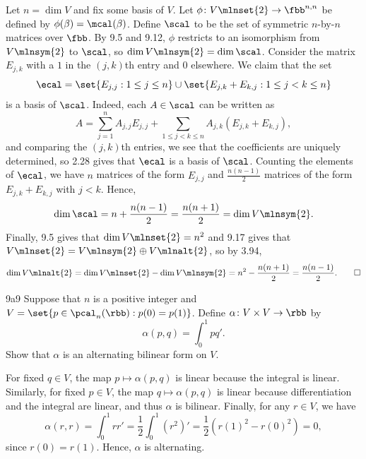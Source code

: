 \begin{sol}
    Let $n = \dim V$ and fix some basis of $V$.
    Let $\phi \colon V\mlnset{2} \to \fbb^{n,n}$ be defined by $\phi(\beta) = \mcal(\beta)$.
    Define $\scal$ to be the set of symmetric $n$-by-$n$ matrices over $\fbb$.
    By 9.5 and 9.12, $\phi$ restricts to an isomorphism from $V\mlnsym{2}$ to $\scal$, so $\dim V\mlnsym{2} = \dim \scal$.
    Consider the matrix $E_{j,k}$ with a $1$ in the $(j,k)$th entry and $0$ elsewhere.
    We claim that the set
    \[
        \ecal = \set{E_{j,j} : 1 \leq j \leq n} \cup \set{E_{j,k} + E_{k,j} : 1 \leq j < k \leq n}
    \]
    is a basis of $\scal$.
    Indeed, each $A \in \scal$ can be written as
    \[
        A = \sum_{j=1}^n A_{j,j} E_{j,j} + \sum_{1 \leq j < k \leq n} A_{j,k} (E_{j,k} + E_{k,j}),
    \]
    and comparing the $(j,k)$th entries, we see that the coefficients are uniquely determined, so 2.28 gives that $\ecal$ is a basis of $\scal$.
    Counting the elements of $\ecal$, we have $n$ matrices of the form $E_{j,j}$ and $\frac{n(n-1)}{2}$ matrices of the form $E_{j,k} + E_{k,j}$ with $j < k$.
    Hence,
    \[
        \dim \scal = n + \frac{n(n-1)}{2} = \frac{n(n+1)}{2} = \dim V\mlnsym{2}.
    \]
    Finally, 9.5 gives that $\dim V\mlnset{2} = n^2$ and 9.17 gives that $V\mlnset{2} = V\mlnsym{2} \oplus V\mlnalt{2}$, so by 3.94,
    \[
        \dim V\mlnalt{2} = \dim V\mlnset{2} - \dim V\mlnsym{2} = n^2 - \frac{n(n+1)}{2} = \frac{n(n-1)}{2}. \qedhere
    \]
\end{sol}

\begin{exercise}{9a9}
    Suppose that $n$ is a positive integer and $V = \set{p \in \pcal_n(\rbb) : p(0) = p(1)}$.
    Define $\alpha \colon V \times V \to \rbb$ by
    \[
        \alpha(p, q) = \int_0^1 pq'.
    \]
    Show that $\alpha$ is an alternating bilinear form on $V$.
\end{exercise}

\begin{sol}
    For fixed $q \in V$, the map $p \mapsto \alpha(p, q)$ is linear because the integral is linear.
    Similarly, for fixed $p \in V$, the map $q \mapsto \alpha(p, q)$ is linear because differentiation and the integral are linear, and thus $\alpha$ is bilinear.
    Finally, for any $r \in V$, we have
    \[
        \alpha(r, r) = \int_0^1 r r' = \frac{1}{2} \int_0^1 (r^2)' = \frac{1}{2} (r(1)^2 - r(0)^2) = 0,
    \]
    since $r(0) = r(1)$.
    Hence, $\alpha$ is alternating.
\end{sol}

